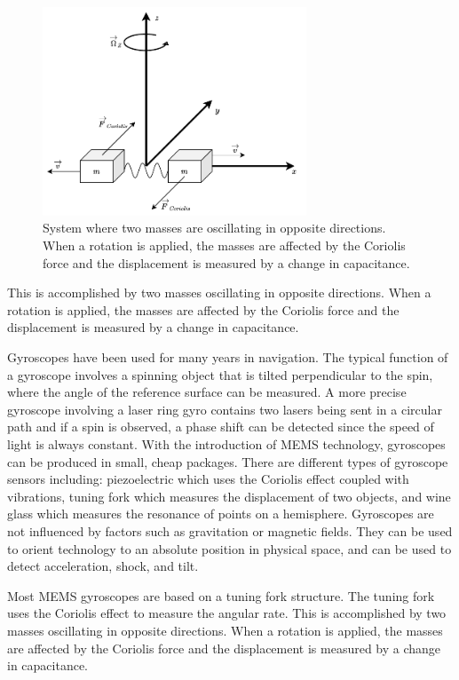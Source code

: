 \begin{figure}[!h]
    \centering
    \includegraphics[width=0.7\textwidth]{figures/coriolis.pdf}
    \caption{ System where two masses are oscillating in opposite directions. When a rotation is applied, the masses are affected by the Coriolis force and the displacement is measured by a change in capacitance.}
    \label{fig:coriolis}
\end{figure}

This is accomplished by two masses oscillating
in opposite directions. When a rotation is applied, the masses are affected by the Coriolis
force and the displacement is measured by a change in capacitance.

Gyroscopes have been used for many years in navigation. The typical function of a gyroscope involves a spinning object that is tilted perpendicular to the spin, where the angle of the reference surface can be measured. A more precise gyroscope involving a laser ring gyro contains two lasers being sent in a circular path and if a spin is observed, a phase shift can be detected since the speed of light is always constant. With the introduction of MEMS technology, gyroscopes can be produced in small, cheap packages. There are different types of gyroscope sensors including: piezoelectric which uses the Coriolis effect coupled with vibrations, tuning fork which measures the displacement of two objects, and wine glass which measures the resonance of points on a hemisphere. Gyroscopes are not influenced by factors such as gravitation or magnetic fields. They can be used to orient technology to an absolute position in physical space, and can be used to detect acceleration, shock, and tilt.

Most MEMS gyroscopes are based on a tuning fork structure. The tuning fork uses the Coriolis effect to measure the angular rate. This is accomplished by two masses oscillating in opposite directions. When a rotation is applied, the masses are affected by the Coriolis force and the displacement is measured by a change in capacitance.

